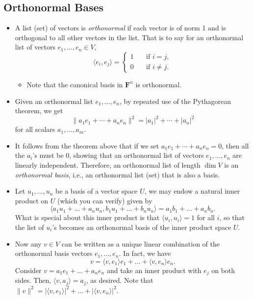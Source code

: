 \documentclass[11pt]{article}
\newcommand{\df}[1]{\textit{\textsf{#1}}}
\newcommand{\F}{\mathbf{F}}
\renewcommand{\d}{\dim}
\newcommand{\inp}[2]{\langle #1, #2 \rangle}
\newcommand{\nm}[1]{\lVert #1 \rVert}
\newcommand{\abs}[1]{\lvert #1 \rvert}
\begin{document}
\subsection{Orthonormal Bases}
\begin{itemize}
    \item A list (set) of vectors is \df{orthonormal} if each vector is of norm 1 and is orthogonal to all other vectors in the list. That is to say for an orthonormal list of vectors $e_1,\dots,e_n \in V$,
    \begin{equation*}
    \inp{e_i}{e_j} = 
        \left\{
            \begin{array}{rl}
                1 \quad & \text{if } i = j, \\
                0 \quad & \text{if } i \not= j.
            \end{array}
        \right.
    \end{equation*}
    \begin{itemize}
        \item Note that the canonical basis in $\F^n$ is orthonormal.
    \end{itemize}
    \item Given an orthonormal list $e_1,\dots,e_n$, by repeated use of the Pythagorean theorem, we get $$\nm{a_1 e_1 + \cdots + a_n e_n}^2 = \abs{a_1}^2 + \cdots +\abs{a_n}^2$$ for all scalars $a_1, \dots, a_m$.
    \item It follows from the theorem above that if we set $a_1 e_1 + \cdots + a_n e_n = 0$, then all the $a_i$'s must be 0, showing that an orthonormal list of vectors $e_1,\dots,e_n$ are linearly independent. Therefore, an orthonormal list of length $\d V$ is an \df{orthonormal basis}, i.e., an orthonormal list (set) that is also a basis.
    \item Let $u_1,\dots,u_n$ be a basis of a vector space $U$, we may endow a natural inner product on $U$ (which you can verify) given by $$\inp{a_1u_1+\dots+a_nu_n}{b_1u_1+\dots+b_nu_n}=a_1b_1+\dots+a_nb_n.$$ What is special about this inner product is that $\inp{u_i}{u_i} = 1$ for all $i$, so that the list of $u_i$'s becomes an orthonormal basis of the inner product space $U$.
    \item Now any $v \in V$ can be written as a unique linear combination of the orthonormal basis vectors $e_1,\dots,e_n$. In fact, we have $$v = \inp{v}{e_1}e_1 + \dots + \inp{v}{e_n}e_n.$$
    Consider $v = a_1 e_1 + \dots + a_n e_n$ and take an inner product with $e_j$ on both sides. Then, $\inp{v}{a_j} = a_j$, as desired. Note that $\nm{v}^2 = \abs{\inp{v}{e_1}}^2 + \dots + \abs{\inp{v}{e_n}}^2$.

\end{itemize}
\end{document}
